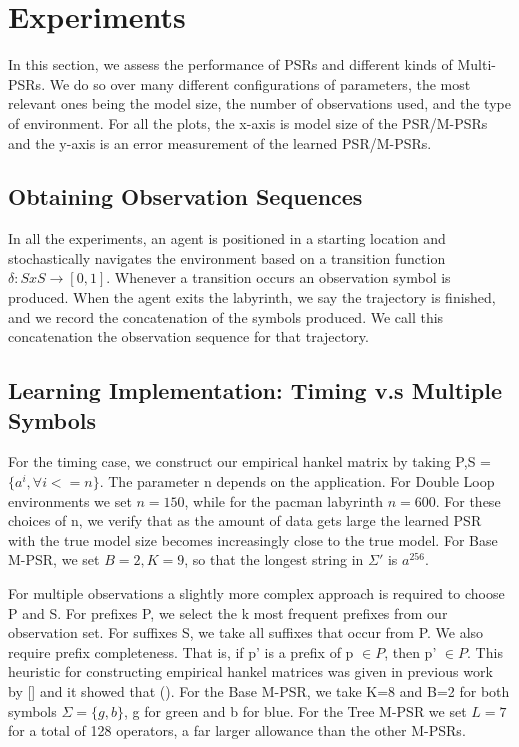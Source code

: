 \section{Experiments}
In this section, we assess the performance of PSRs and different kinds of Multi-PSRs. We do so over many different configurations of parameters, the most relevant ones being the model size, the number of observations used, and the type of environment. For all the plots, the x-axis is model size of the PSR/M-PSRs and the y-axis is an error measurement of the learned PSR/M-PSRs.

\subsection{Obtaining Observation Sequences}
In all the experiments, an agent is positioned in a starting location and stochastically navigates the environment based on a transition function $\delta:SxS\rightarrow[0,1]$. Whenever a transition occurs an observation symbol is produced. When the agent exits the labyrinth, we say the trajectory is finished, and we record the concatenation of the symbols produced. We call this concatenation the observation sequence for that trajectory.  

\subsection{Learning Implementation: Timing v.s Multiple Symbols}

For the timing case, we construct our empirical hankel matrix by taking P,S = $\{a^i, \forall i<=n\}$. The parameter n depends on the application. For Double Loop environments we set $n = 150$, while for the pacman labyrinth $n = 600$. For these choices of n, we verify that as the amount of data gets large the learned PSR with the true model size becomes increasingly close to the true model. For Base M-PSR, we set $B=2,K=9$, so that the longest string in $\Sigma'$ is $a^256$.

For multiple observations a slightly more complex approach is required to choose P and S. For prefixes P, we select the k most frequent prefixes from our observation set. For suffixes S, we take all suffixes that occur from P. We also require prefix completeness. That is, if p' is a prefix of p $\in P$, then p' $\in P$. This heuristic for constructing empirical hankel matrices was given in previous work by [] and it showed that (). For the Base M-PSR, we take K=8 and B=2 for both symbols $\Sigma=\{g,b\}$, g for green and b for blue. For the Tree M-PSR we set $L=7$ for a total of 128 operators, a far larger allowance than the other M-PSRs. 

